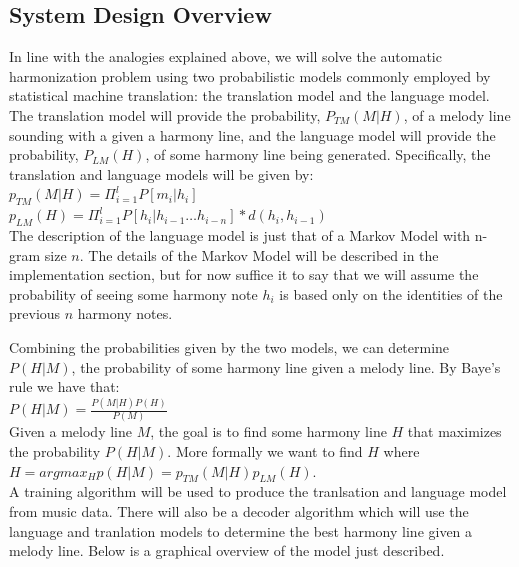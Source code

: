 \documentclass{sig-alternate}
\begin{document}
\subsection{System Design Overview}

In line with the analogies explained above, we will solve the automatic harmonization problem using two probabilistic models commonly employed by statistical machine translation: the translation model and the language model. The translation model will provide the probability, $P_{TM}(M | H)$, of a melody line sounding with a given a harmony line, and the language model will provide the probability, $P_{LM}(H)$, of some harmony line being generated. Specifically, the translation and language models will be given by: \\

$p_{TM}(M | H) = \Pi_{i = 1}^{l} P[m_{i} | h_{i}]$\\

$p_{LM}(H) = \Pi_{i = 1}^{l} P[h_{i} | h_{i - 1} \ldots h_{i - n}] * d(h_{i}, h_{i-1})$\\

The description of the language model is just that of a Markov Model with n-gram size $n$. The details of the Markov Model will be described in the implementation section, but for now suffice it to say that we will assume the probability of seeing some harmony note $h_{i}$ is based only on the identities of the previous $n$ harmony notes. 

Combining the probabilities given by the two models, we can determine $P(H | M)$, the probability of some harmony line given a melody line. By Baye's rule we have that: \\

$P(H | M) = \frac{P(M | H)P(H)}{P(M)}$\\

Given a melody line $M$, the goal is to find some harmony line $H$ that maximizes the probability $P(H | M)$. More formally we want to find $H$ where\\

$H = argmax_{H}p(H | M) = p_{TM}(M | H)p_{LM}(H)$.\\

A training algorithm will be used to produce the tranlsation and language model from music data. There will also be a decoder
algorithm which will use the language and tranlation models to determine the best harmony line given a melody line. Below is a graphical overview of the model just described.\\
\end{document}
